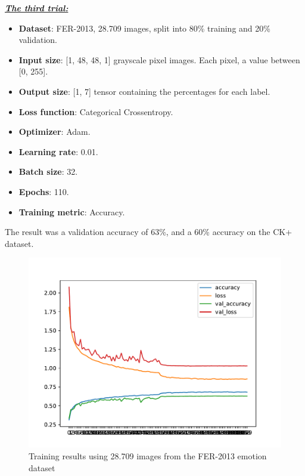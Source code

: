 \documentclass[runningheads,a4paper,11pt]{report}
\begin{document}
\clearpage
\underline{\textbf{\emph{The third trial:}}}
\begin{itemize}
	\item \textbf{Dataset}: FER-2013, 28.709 images, split into 80\% training and 20\% validation.
	\item \textbf{Input size}: [1, 48, 48, 1] grayscale pixel images. Each pixel, a value between [0, 255].
	\item \textbf{Output size}: [1, 7] tensor containing the percentages for each label.
	\item \textbf{Loss function}: Categorical Crossentropy.
	\item \textbf{Optimizer}: Adam.
	\item \textbf{Learning rate}: 0.01.
	\item \textbf{Batch size}: 32.
	\item \textbf{Epochs}: 110.
	\item \textbf{Training metric}: Accuracy.
\end{itemize}
The result was a validation accuracy of 63\%, and a 60\% accuracy on the CK+ dataset.
\begin{figure}[htbp]
\begin{center}
	\includegraphics[scale=0.8]{Fig/fer_training_28k_001.pdf}
	\caption{Training results using 28.709 images from the FER-2013 emotion dataset}
	\label{fer_training_28k_001}
\end{center}
\end{figure}
\end{document}
